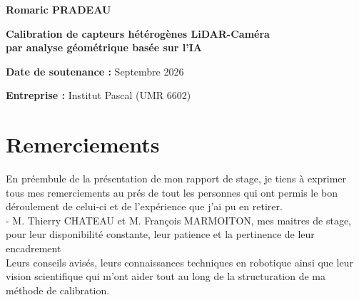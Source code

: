\documentclass[12pt,a4paper,oneside]{report}
\begin{document}
\begin{titlepage}
    {\large \textbf{Romaric PRADEAU} \par}
    \vspace{0.8cm}
    {\LARGE \textbf{Calibration de capteurs hétérogènes LiDAR-Caméra \\ par analyse géométrique basée sur l'IA} \par}
    
    \vfill
    
    \begin{flushleft}
        \large
        \textbf{Date de soutenance :} Septembre 2026 \par
        \vspace{0.2cm}
        \textbf{Entreprise :} Institut Pascal (UMR 6602)
    \end{flushleft}
    
\end{titlepage}

\thispagestyle{empty} %

\chapter*{Remerciements}
\thispagestyle{empty} %

En préembule de la présentation de mon rapport de stage, je tiens à exprimer tous mes remerciements au prés de tout les personnes qui ont permis le bon déroulement de celui-ci et de l'expérience que j'ai pu en retirer. \\

- M. Thierry CHATEAU et M. François MARMOITON, mes maitres de stage, pour leur disponibilité constante, leur patience et la pertinence de leur encadrement \\
Leurs conseils avisés, leurs connaissances techniques en robotique ainsi que leur vision scientifique qui m'ont aider tout au long de la structuration de ma méthode de calibration.\\ 
\end{document}
